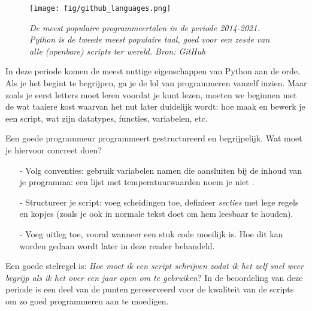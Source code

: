 \documentclass[a4paper,11pt, fleqn]{article}
\begin{document}
\begin{figure*}[h]
	\texttt{[image: fig/github\_languages.png]}
	\caption{\it De meest populaire programmeertalen in de periode 2014-2021. Python is de tweede meest populaire taal, goed voor een zesde van alle (openbare) scripts ter wereld. \textit{Bron: GitHub}}
	\label{github-languages}
\end{figure*}

In deze periode komen de meest nuttige eigenschappen van Python aan de orde. Als je het begint te begrijpen, ga je de lol van programmeren vanzelf inzien. Maar zoals je eerst letters moet leren voordat je kunt lezen, moeten we beginnen met de wat taaiere kost waarvan het nut later duidelijk wordt: hoe maak en bewerk je een script, wat zijn datatypes, functies, variabelen, etc.

Een goede programmeur programmeert gestructureerd en begrijpelijk. Wat moet je hiervoor concreet doen?
\begin{itemize}
\item[-] Volg conventies: gebruik variabelen namen die aansluiten bij de inhoud van je programma: een lijst met temperatuurwaarden noem je niet .
\item[-] Structureer je script: voeg scheidingen toe, definieer \textit{secties} met lege regels en kopjes (zoals je ook in normale tekst doet om hem leesbaar te houden).
\item[-] Voeg uitleg toe, vooral wanneer een stuk code moeilijk is. Hoe dit kan worden gedaan wordt later in deze reader behandeld.
\end{itemize}

Een goede stelregel is: \textit{Hoe moet ik een script schrijven zodat ik het zelf snel weer begrijp als ik het over een jaar open om te gebruiken}? In de beoordeling van deze periode is een deel van de punten gereserveerd voor de kwaliteit van de scripts om zo goed programmeren aan te moedigen.
\end{document}
